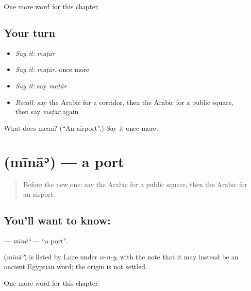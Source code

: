 \begin{grammarlens}[title={What you've built}]
One more word for this chapter.
\end{grammarlens}

\subsection*{Your turn}
\begin{itemize}
\raggedright
  \item \emph{Say it:} \emph{maṭār}
  \item \emph{Say it:} \emph{maṭār}, once more
  \item \emph{Say it:} say \emph{maṭār}
  \item \emph{Recall:} say the Arabic for a corridor, then the Arabic for a public square, then say \emph{maṭār} again
\end{itemize}

\begin{tcolorbox}[breakable,colback=teal!4,colframe=teal!35!black,title={Before you move on}]
What does  mean? (\textquotedblleft{}An airport\textquotedblright{}.) Say it once more.
\end{tcolorbox}
\section[\texorpdfstring{\ar{ميناء} (mīnāʾ)}{ميناء (mīnāʾ)}]{ (mīnāʾ) — a port}

\label{lesson:AR-C100-mina}



\begin{quote}
Before the new one: say the Arabic for a public square, then the Arabic for an airport.
\end{quote}

\subsection*{You'll want to know: }
\textbf{} — \emph{mīnāʾ} — \textquotedblleft{}a port\textquotedblright{}.

\begin{cousinweb}
\textbf{} (\emph{mīnāʾ}) is listed by Lane under \emph{w-n-y}, with the note that it may instead be an ancient Egyptian word; the origin is not settled.
\end{cousinweb}

\begin{grammarlens}[title={What you've built}]
One more word for this chapter.
\end{grammarlens}

